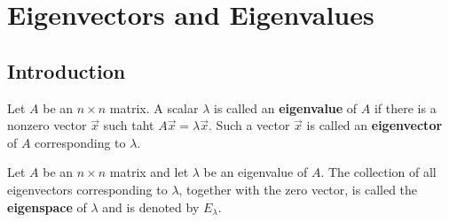 \documentclass{article}
\begin{document}
\section{Eigenvectors and Eigenvalues}
\subsection{Introduction}
\begin{definition}
    Let $A$ be an $n\times n$ matrix. A scalar $\lambda$ is called an \textbf{eigenvalue} of $A$ if there is a nonzero vector $\vec x$ such taht $A\vec x=\lambda\vec x$. Such a vector $\vec x$ is called an \textbf{eigenvector} of $A$ corresponding to $\lambda$.
\end{definition}
\begin{definition}
    Let $A$ be an $n\times n$ matrix and let $\lambda$ be an eigenvalue of $A$. The collection of all eigenvectors corresponding to $\lambda$, together with the zero vector, is called the \textbf{eigenspace} of $\lambda$ and is denoted by $E_\lambda$.
\end{definition}
\end{document}
